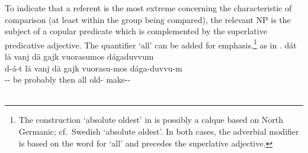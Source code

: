 To indicate that a referent is the most extreme concerning the characteristic of comparison (at least within the group being compared), the relevant NP is the subject of a copular predicate which is complemented by the superlative predicative adjective. The quantifier  ‘all’ can be added for emphasis,\footnote{The construction  ‘absolute oldest’ in  is possibly a calque based on North Germanic; cf.~Swedish  ‘absolute oldest’. In both cases, the adverbial modifier is based on the word for ‘all’ and precedes the superlative adjective.} 
as in .
\ea\label{comparingNPsEx5}
\glll	dát lä vanj dä gajk vuorasumos dágaduvvum\\
	d-á-t lä vanj dä gajk vuorasu-mos dága-duvvu-m\\
	-- be\BS{} probably then all old-\BS{} make--\\\nopagebreak
{}\\	
\z





